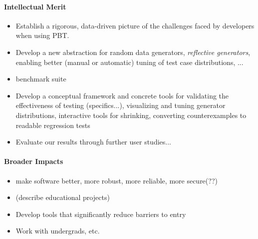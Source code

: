 \paragraph*{Intellectual Merit}
\begin{itemize}
\item Establish a rigorous, data-driven picture of the challenges
faced by developers when using PBT.
\item Develop a new abstraction for random data generators, {\em
  reflective generators}, enabling better (manual or automatic) tuning of test case
distributions, ...
\item benchmark suite
\item Develop a conceptual framework and concrete tools for validating
the effectiveness of testing (specifics...),
visualizing and tuning generator distributions,
interactive tools for shrinking,
converting counterexamples to readable regression tests
\item Evaluate our results through further user studies...
\end{itemize}

\paragraph*{Broader Impacts}
\begin{itemize}
\item make software better, more robust, more reliable, more secure(??)
\item (describe educational projects)
\item Develop tools that significantly reduce barriers to entry
\item Work with undergrads, etc.
\end{itemize}

